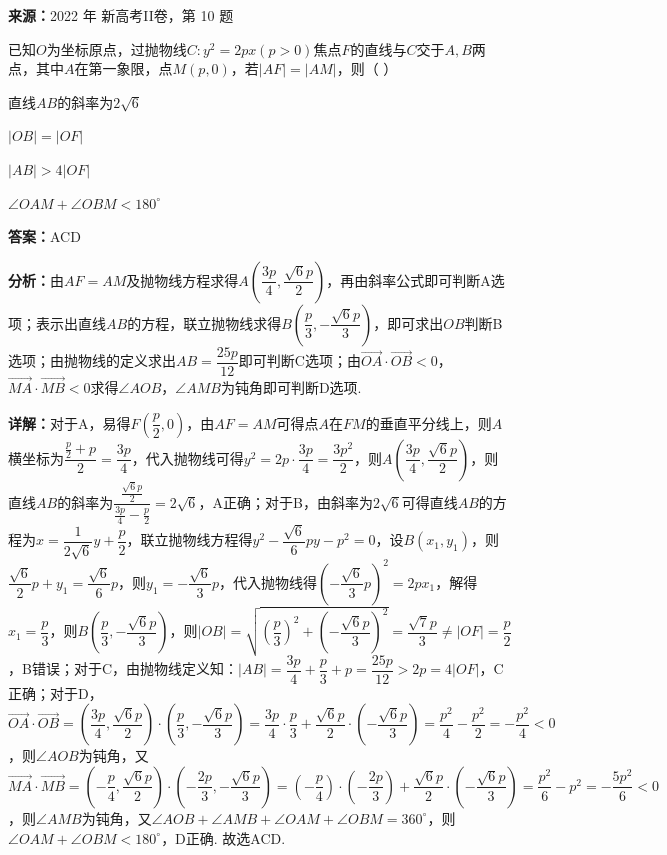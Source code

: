 \begin{question}[points=5]
\textbf{来源：}2022 年 新高考II卷，第 10 题\par
已知$O$为坐标原点，过抛物线$C:y^2=2px(p>0)$焦点$F$的直线与$C$交于$A,B$两点，其中$A$在第一象限，点$M(p,0)$，若$|AF|=|AM|$，则（ ）
\begin{choices}
  \item 直线$AB$的斜率为$2\sqrt{6}$
  \item $|OB|=|OF|$
  \item $|AB|>4|OF|$
  \item $\angle OAM+\angle OBM<180^\circ$
\end{choices}
\begin{solution}
\textbf{答案：}ACD

\textbf{分析：}由$AF=AM$及抛物线方程求得$A\left(\dfrac{3p}{4},\dfrac{\sqrt{6}p}{2}\right)$，再由斜率公式即可判断A选项；表示出直线$AB$的方程，联立抛物线求得$B\left(\dfrac{p}{3},-\dfrac{\sqrt{6}p}{3}\right)$，即可求出$OB$判断B选项；由抛物线的定义求出$AB=\dfrac{25p}{12}$即可判断C选项；由$\overrightarrow{OA}\cdot\overrightarrow{OB}<0$，$\overrightarrow{MA}\cdot\overrightarrow{MB}<0$求得$\angle AOB$，$\angle AMB$为钝角即可判断D选项.

\textbf{详解：}对于A，易得$F\left(\dfrac{p}{2},0\right)$，由$AF=AM$可得点$A$在$FM$的垂直平分线上，则$A$横坐标为$\dfrac{\frac{p}{2}+p}{2}=\dfrac{3p}{4}$，代入抛物线可得$y^2=2p\cdot\dfrac{3p}{4}=\dfrac{3p^2}{2}$，则$A\left(\dfrac{3p}{4},\dfrac{\sqrt{6}p}{2}\right)$，则直线$AB$的斜率为$\dfrac{\frac{\sqrt{6}p}{2}}{\frac{3p}{4}-\frac{p}{2}}=2\sqrt{6}$，A正确；对于B，由斜率为$2\sqrt{6}$可得直线$AB$的方程为$x=\dfrac{1}{2\sqrt{6}}y+\dfrac{p}{2}$，联立抛物线方程得$y^2-\dfrac{\sqrt{6}}{6}py-p^2=0$，设$B(x_1,y_1)$，则$\dfrac{\sqrt{6}}{2}p+y_1=\dfrac{\sqrt{6}}{6}p$，则$y_1=-\dfrac{\sqrt{6}}{3}p$，代入抛物线得$\left(-\dfrac{\sqrt{6}}{3}p\right)^2=2px_1$，解得$x_1=\dfrac{p}{3}$，则$B\left(\dfrac{p}{3},-\dfrac{\sqrt{6}p}{3}\right)$，则$|OB|=\sqrt{\left(\dfrac{p}{3}\right)^2+\left(-\dfrac{\sqrt{6}p}{3}\right)^2}=\dfrac{\sqrt{7}p}{3}\neq|OF|=\dfrac{p}{2}$，B错误；对于C，由抛物线定义知：$|AB|=\dfrac{3p}{4}+\dfrac{p}{3}+p=\dfrac{25p}{12}>2p=4|OF|$，C正确；对于D，$\overrightarrow{OA}\cdot\overrightarrow{OB}=\left(\dfrac{3p}{4},\dfrac{\sqrt{6}p}{2}\right)\cdot\left(\dfrac{p}{3},-\dfrac{\sqrt{6}p}{3}\right)=\dfrac{3p}{4}\cdot\dfrac{p}{3}+\dfrac{\sqrt{6}p}{2}\cdot\left(-\dfrac{\sqrt{6}p}{3}\right)=\dfrac{p^2}{4}-\dfrac{p^2}{2}=-\dfrac{p^2}{4}<0$，则$\angle AOB$为钝角，又$\overrightarrow{MA}\cdot\overrightarrow{MB}=\left(-\dfrac{p}{4},\dfrac{\sqrt{6}p}{2}\right)\cdot\left(-\dfrac{2p}{3},-\dfrac{\sqrt{6}p}{3}\right)=\left(-\dfrac{p}{4}\right)\cdot\left(-\dfrac{2p}{3}\right)+\dfrac{\sqrt{6}p}{2}\cdot\left(-\dfrac{\sqrt{6}p}{3}\right)=\dfrac{p^2}{6}-p^2=-\dfrac{5p^2}{6}<0$，则$\angle AMB$为钝角，又$\angle AOB+\angle AMB+\angle OAM+\angle OBM=360^\circ$，则$\angle OAM+\angle OBM<180^\circ$，D正确. 故选ACD.
\end{solution}
\end{question}


